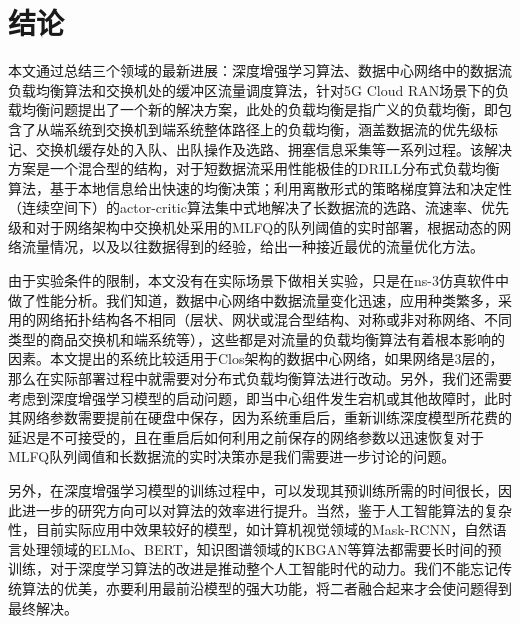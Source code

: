 
\chapter{结论}
本文通过总结三个领域的最新进展：深度增强学习算法、数据中心网络中的数据流负载均衡算法和交换机处的缓冲区流量调度算法，针对5G Cloud RAN场景下的负载均衡问题提出了一个新的解决方案，此处的负载均衡是指广义的负载均衡，即包含了从端系统到交换机到端系统整体路径上的负载均衡，涵盖数据流的优先级标记、交换机缓存处的入队、出队操作及选路、拥塞信息采集等一系列过程。该解决方案是一个混合型的结构，对于短数据流采用性能极佳的DRILL分布式负载均衡算法，基于本地信息给出快速的均衡决策；利用离散形式的策略梯度算法和决定性（连续空间下）的actor-critic算法集中式地解决了长数据流的选路、流速率、优先级和对于网络架构中交换机处采用的MLFQ的队列阈值的实时部署，根据动态的网络流量情况，以及以往数据得到的经验，给出一种接近最优的流量优化方法。

由于实验条件的限制，本文没有在实际场景下做相关实验，只是在ns-3仿真软件中做了性能分析。我们知道，数据中心网络中数据流量变化迅速，应用种类繁多，采用的网络拓扑结构各不相同（层状、网状或混合型结构、对称或非对称网络、不同类型的商品交换机和端系统等），这些都是对流量的负载均衡算法有着根本影响的因素。本文提出的系统比较适用于Clos架构的数据中心网络，如果网络是3层的，那么在实际部署过程中就需要对分布式负载均衡算法进行改动。另外，我们还需要考虑到深度增强学习模型的启动问题，即当中心组件发生宕机或其他故障时，此时其网络参数需要提前在硬盘中保存，因为系统重启后，重新训练深度模型所花费的延迟是不可接受的，且在重启后如何利用之前保存的网络参数以迅速恢复对于MLFQ队列阈值和长数据流的实时决策亦是我们需要进一步讨论的问题。

另外，在深度增强学习模型的训练过程中，可以发现其预训练所需的时间很长，因此进一步的研究方向可以对算法的效率进行提升。当然，鉴于人工智能算法的复杂性，目前实际应用中效果较好的模型，如计算机视觉领域的Mask-RCNN，自然语言处理领域的ELMo、BERT，知识图谱领域的KBGAN等算法都需要长时间的预训练，对于深度学习算法的改进是推动整个人工智能时代的动力。我们不能忘记传统算法的优美，亦要利用最前沿模型的强大功能，将二者融合起来才会使问题得到最终解决。